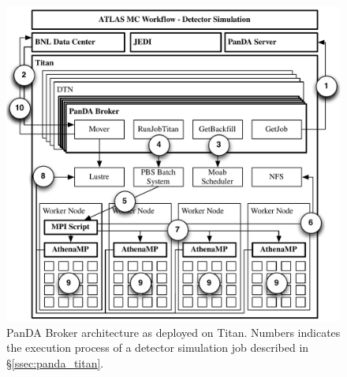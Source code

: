 \begin{figure}
    \centering
    \includegraphics[width=\columnwidth]{panda_broker_architecture.pdf}
    \vspace{-0.3in}
    \caption{PanDA Broker architecture as deployed on Titan. Numbers
    indicates the execution process of a detector simulation job described in
    \S\ref{ssec:panda_titan}.}\label{fig:panda_broker}
\end{figure}
\vspace{-0.04in}
